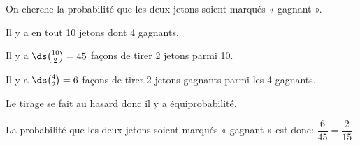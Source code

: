 \begin{enumerate}
On cherche la probabilité que les deux jetons soient marqués « gagnant ». 



Il y a en tout 10 jetons dont 4 gagnants.

\begin{list}{\textbullet}{}
\item Il y a $\ds\binom{10}{2}=45$ façons de tirer 2 jetons parmi 10.
\item Il y a $\ds\binom{4}{2}= 6$ façons de tirer 2 jetons gagnants parmi les 4 gagnants.
\item Le tirage se fait au hasard donc il y a équiprobabilité.

\end{list}

La probabilité que les deux jetons soient marqués « gagnant » est donc: $\dfrac{6}{45} = \dfrac{2}{15}$. 

\end{enumerate}
